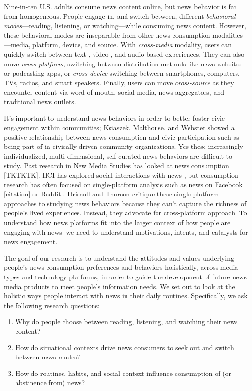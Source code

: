 \documentclass[sigchi]{acmart}
\begin{document}
 Nine-in-ten U.S. adults consume news content online\cite{pew_stocking_2018}, but news behavior is far from homogeneous. People engage in, and switch between, different \textit{behavioral modes}—reading, listening, or watching—while consuming news content. However, these behavioral modes are inseparable from other news consumption modalities—media, platform, device, and source. With \emph{cross-media} modality, users can quickly switch between text-, video-, and audio-based experiences. They can also move \emph{cross-platform}, switching between distribution methods like news websites or podcasting apps, or \emph{cross-device} switching between smartphones, computers, TVs, radios, and smart speakers. Finally, users can move \emph{cross-source} as they encounter content via word of mouth, social media, news aggregators, and traditional news outlets. 
 
It's important to understand news behaviors in order to better foster civic engagement within communities; Ksiaszek, Malthouse, and Webster\cite{ksiazek2010news} showed a positive relationship between news consumption and civic participation such as being part of in civically driven community organizations. Yes these increasingly individualized, multi-dimensional, self-curated news behaviors are difficult to study. Past research in New Media Studies has looked at news consumption [TKTKTK]. HCI has explored  social interactions with news \cite{Lottridge:2018:LHT:3173574.3173634}, but consumption research has often focused on single-platform analysis such as news on Facebook [citation] or Reddit \cite{Leavitt:2014:UHS:2556288.2557140}\cite{ Leavitt:2017:UMN:3171581.3134700}. Driscoll and Thorson \cite{driscoll2015searching}  critique these single-platform approaches to studying news behaviors because they can't capture the richness of people's lived experiences. Instead, they advocate for cross-platform approach. To understand how news platforms fit into the larger context of how people are engaging with news, we need to understand motivations, intents, and catalysts for news engagement. 

The goal of our research is to understand the attitudes and values underlying people’s news consumption preferences and behaviors holistically, across media types and technology platforms, in order to guide the development of future news media products to meet people’s information needs. We set out to look at the holistic ways people interact with news in their daily routines. Specifically, we ask the following research questions:
\begin{enumerate}
    \item Why do people choose between reading, listening, and watching their news content?
    \item How do situational contexts drive news consumers to seek out and switch between news modes?
    \item How do routines, habits, and social context influence consumption of (or abstinence from) news?
\end{enumerate}
\end{document}
